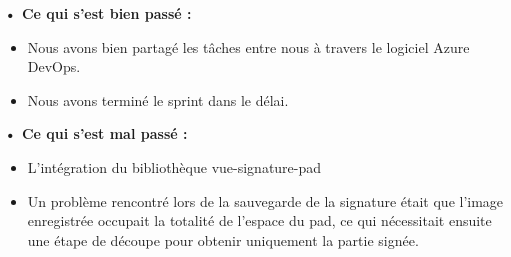 \noindent\textbf{•	Ce qui s'est bien passé :}
\begin{itemize}
  \item Nous avons bien partagé les tâches entre nous à travers le logiciel Azure DevOps. 
  \item Nous avons terminé le sprint dans le délai.
\end{itemize}

\noindent\textbf{•	Ce qui s'est mal passé :}
\begin{itemize}
  \item L'intégration du bibliothèque vue-signature-pad
  \item Un problème rencontré lors de la sauvegarde de la signature était que l'image enregistrée occupait la totalité de l'espace du pad, ce qui nécessitait ensuite une étape de découpe pour obtenir uniquement la partie signée.
\end{itemize}

